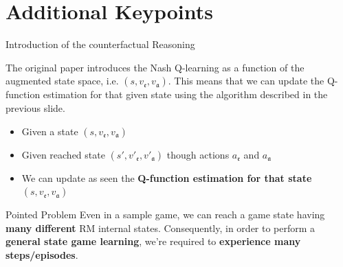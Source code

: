 \documentclass[10pt, aspectratio=169]{beamer}
\newcommand{\evidenzia}[1]{\textcolor{verdeSalvia}{\textbf{#1}}}
\begin{document}
\section{Additional Keypoints}

\begin{frame}{Introduction of the counterfactual Reasoning}

    The original paper introduces the Nash Q-learning as a function of the augmented state space, i.e. $(s, v_{\mathfrak{e}}, v_{\mathfrak{a}})$. This means that we can update the Q-function estimation for that given state using the algorithm described in the previous slide. 
    
    \begin{itemize}
        \item Given a state $(s, v_{\mathfrak{e}}, v_{\mathfrak{a}})$
        \item Given reached state $(s', v'_{\mathfrak{e}}, v'_{\mathfrak{a}})$ though actions $a_{\mathfrak{e}}$ and $a_{\mathfrak{a}}$
        \item We can update as seen the \evidenzia{Q-function estimation for that state} $(s, v_{\mathfrak{e}}, v_{\mathfrak{a}})$
    \end{itemize}

    \begin{block}{Pointed Problem}
    Even in a sample game, we can reach a game state having \evidenzia{many different} RM internal states. Consequently, in order to perform a \evidenzia{general state game learning}, we're required to \evidenzia{experience many steps/episodes}.
    \end{block}

\end{frame}
\end{document}
